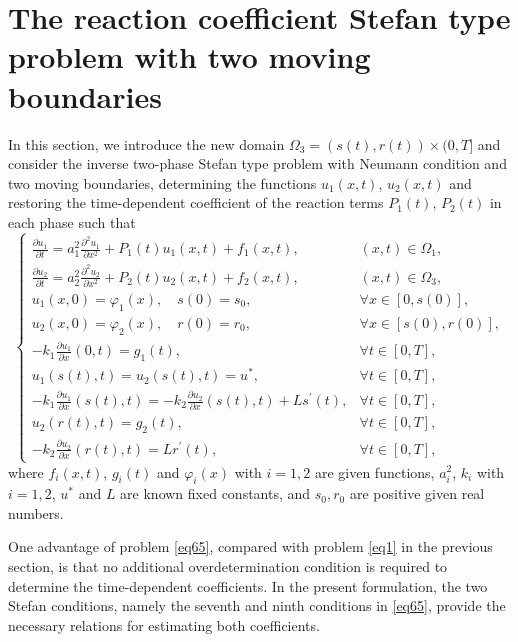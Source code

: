 \documentclass[preprint,12pt,authoryear]{elsarticle}
\begin{document}
\section{The reaction coefficient Stefan type problem with two moving boundaries}
In this section, we introduce the new domain $\Omega_3=(s(t),r(t))\times(0,T]$ and consider the inverse two-phase Stefan type problem with Neumann condition and two moving boundaries, determining the functions $u_1(x,t)$, $u_2(x,t)$ and restoring the time-dependent coefficient of the reaction terms $P_1(t)$, $P_2(t)$ in each phase such that
\begin{equation}\label{eq65}
    \begin{cases}
        \frac{\partial u_1}{\partial t}=a_1^2\frac{\partial^2 u_1}{\partial x^2}+P_1(t)u_1(x,t)+f_1(x,t),&(x,t)\in\Omega_1,\\
        \frac{\partial u_2}{\partial t}=a_2^2\frac{\partial^2 u_2}{\partial x^2}+P_2(t)u_2(x,t)+f_2(x,t),&(x,t)\in\Omega_3,\\
        u_1(x,0)=\varphi_1(x),\quad s(0)=s_0,&\forall x\in[0,s(0)],\\
        u_2(x,0)=\varphi_2(x),\quad r(0)=r_0,&\forall x\in[s(0),r(0)],\\
        -k_1\frac{\partial u_1}{\partial x}(0,t)=g_1(t),&\forall t\in[0,T],\\
        u_1(s(t),t)=u_2(s(t),t)=u^*,&\forall t\in[0,T],\\
        -k_1\frac{\partial u_1}{\partial x}(s(t),t)=-k_2\frac{\partial u_2}{\partial x}(s(t),t)+Ls^{\prime}(t),&\forall t\in[0,T],\\
        u_2(r(t),t)=g_2(t),&\forall t\in[0,T],\\
        -k_2\frac{\partial u_2}{\partial x}(r(t),t)=Lr^{\prime}(t),&\forall t\in[0,T],
    \end{cases}
\end{equation}
where $f_i(x,t)$, $g_i(t)$ and $\varphi_i(x)$ with $i=1,2$ are given functions, $a_i^2$, $k_i$ with $i=1,2$, $u^*$ and $L$ are known fixed constants, and $s_0, r_0$ are positive given real numbers.

One advantage of problem \eqref{eq65}, compared with problem \eqref{eq1} in the previous section, is that no additional overdetermination condition is required to determine the time-dependent coefficients. In the present formulation, the two Stefan conditions, namely the seventh and ninth conditions in \eqref{eq65}, provide the necessary relations for estimating both coefficients.
\end{document}
